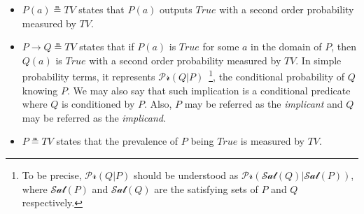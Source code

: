 \documentclass[runningheads]{llncs}
\newcommand{\SP}{\;\;\;}
\newcommand{\TTrue}{\textit{True}}
\newcommand{\TEval}{\textit{Evaluation}}
\newcommand{\TLamb}{\textit{Lambda}}
\newcommand{\TImpl}{\textit{Implication}}
\newcommand{\TTV}{\textit{TV}}
\newcommand{\TBTV}{\langle \TTV \rangle}
\newcommand{\sat}{\mathcal{Sat}}
\newcommand{\prob}{\mathcal{Pr}}
\newcommand{\limp}{\rightarrow}
\begin{document}
\begin{itemize}
\item $P(a) \measeq \TTV$ states that $P(a)$ outputs $\TTrue$ with a
  second order probability measured by $\TTV$.
\item
  $P \limp Q \measeq \TTV$ states that if $P(a)$ is $\TTrue$ for some
  $a$ in the domain of $P$, then $Q(a)$ is $\TTrue$ with a second
  order probability measured by $\TTV$.  In simple probability terms,
  it represents $\prob(Q|P)$~\footnote{To be precise, $\prob(Q|P)$
    should be understood as $\prob(\sat(Q)|\sat(P))$, where $\sat(P)$
    and $\sat(Q)$ are the satisfying sets of $P$ and $Q$
    respectively.}, the conditional probability of $Q$ knowing $P$.
  We may also say that such implication is a conditional predicate
  where $Q$ is conditioned by $P$.  Also, $P$ may be referred as the
  \emph{implicant} and $Q$ may be referred as the \emph{implicand}.
\item $P \measeq \TTV$ states that the prevalence of $P$ being
  $\TTrue$ is measured by $\TTV$.
\end{itemize}
\end{document}
